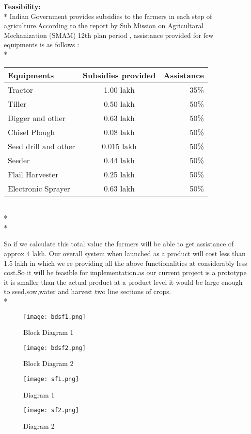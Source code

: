 \documentclass[12pt]{article}
\begin{document}
\textbf{Feasibility:}
\\* Indian Government provides subsidies to the farmers in each step of agriculture.According to the report by Sub Mission on Agricultaral Mechanization (SMAM) 12th plan period , assistance provided for few equipments  is as follows : \\*

\begin{tabular}{||l|c|r||}
	\hline
	Equipments & Subsidies provided & Assistance \\
	\hline
	Tractor & 1.00 lakh & 35\% \\
	Tiller & 0.50 lakh & 50\% \\
	Digger and other & 0.63 lakh & 50\% \\
	Chisel Plough & 0.08 lakh & 50\% \\
	Seed drill and other & 0.015 lakh & 50\% \\
	Seeder & 0.44 lakh &  50\% \\
	Flail Harvester & 0.25 lakh & 50\% \\	
	Electronic Sprayer & 0.63 lakh & 50\% \\
	\hline
\end{tabular} \\* \\*

 So if we calculate this total value the farmers will be able to get assistance of approx 4 lakh. Our overall system when launched as a product will cost less than 1.5 lakh in which we re providing all the above functionalities at considerably less cost.So it will be feasible for implementation.as our current project is a prototype it is smaller than the actual product at a product level it would be large enough to seed,sow,water and harvest two line sections of crops.  \\*
 
 
\begin{figure}
	\centering
	\texttt{[image: bdsf1.png]}
	\caption{Block Diagram 1}
	
	\texttt{[image: bdsf2.png]}
	\caption{Block Diagram 2}
	
	\label{image_2} %
	\label{image_1} %
\end{figure}


\begin{figure}
	\centering
	\texttt{[image: sf1.png]}
	\caption{ Diagram 1} 
	
	\texttt{[image: sf2.png]}
	\caption{ Diagram 2} 
	
	
	\label{image_1} %
	\label{image_2} %
	
\end{figure}
\end{document}

